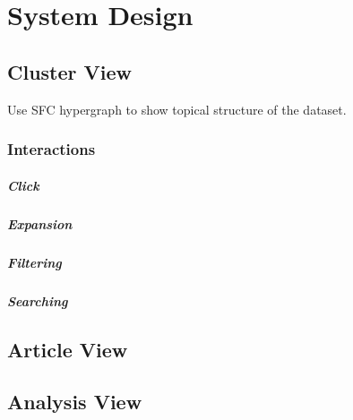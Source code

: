 \section{System Design}
\subsection{Cluster View}
Use SFC hypergraph to show topical structure of the dataset.

\subsubsection{Interactions}
\subparagraph{Click}
\subparagraph{Expansion}
\subparagraph{Filtering}
\subparagraph{Searching}

\subsection{Article View}

\subsection{Analysis View}